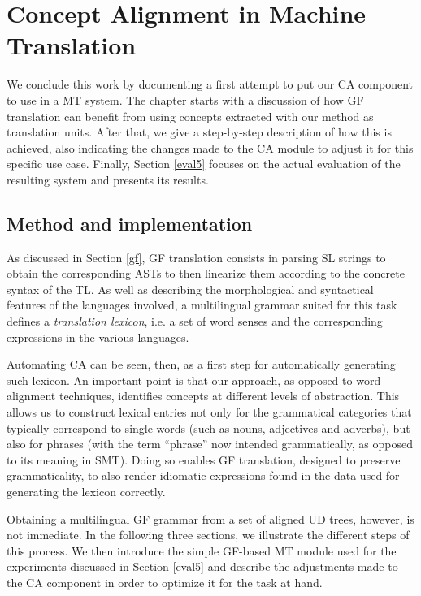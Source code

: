 \chapter{Concept Alignment in Machine Translation} \label{ch5}
We conclude this work by documenting a first attempt to put our CA component to use in a MT system. 
The chapter starts with a discussion of how GF translation can benefit from using concepts extracted with our method as translation units.
After that, we give a step-by-step description of how this is achieved, also indicating the changes made to the CA module to adjust it for this specific use case. 
Finally, Section \ref{eval5} focuses on the actual evaluation of the resulting system and presents its results.

\section{Method and implementation}
As discussed in Section \ref{gf}, GF translation consists in parsing SL strings to obtain the corresponding ASTs to then linearize them according to the concrete syntax of the TL.
As well as describing the morphological and syntactical features of the languages involved, a multilingual grammar suited for this task defines a \textit{translation lexicon}, i.e. a set of word senses and the corresponding expressions in the various languages. \smallskip

Automating CA can be seen, then, as a first step for automatically generating such lexicon. 
An important point is that our approach, as opposed to word alignment techniques, identifies concepts at different levels of abstraction.
This allows us to construct lexical entries not only for the grammatical categories that typically correspond to single words (such as nouns, adjectives and adverbs), but also for phrases (with the term ``phrase'' now intended grammatically, as opposed to its meaning in SMT).
Doing so enables GF translation, designed to preserve grammaticality, to also render idiomatic expressions found in the data used for generating the lexicon correctly. \smallskip

Obtaining a multilingual GF grammar from a set of aligned UD trees, however, is not immediate. 
In the following three sections, we illustrate the different steps of this process. 
We then introduce the simple GF-based MT module used for the experiments discussed in Section \ref{eval5} and describe the adjustments made to the CA component in order to optimize it for the task at hand. 

